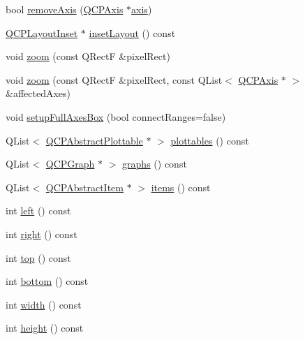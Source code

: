\begin{DoxyCompactItemize}
\item 
bool \mbox{\hyperlink{class_q_c_p_axis_rect_a03c39cd9704f0d36fb6cf980cdddcbaa}{remove\+Axis}} (\mbox{\hyperlink{class_q_c_p_axis}{Q\+C\+P\+Axis}} $\ast$\mbox{\hyperlink{class_q_c_p_axis_rect_a583ae4f6d78b601b732183f6cabecbe1}{axis}})
\item 
\mbox{\hyperlink{class_q_c_p_layout_inset}{Q\+C\+P\+Layout\+Inset}} $\ast$ \mbox{\hyperlink{class_q_c_p_axis_rect_a949f803466619924c7018df4b511ae10}{inset\+Layout}} () const
\item 
void \mbox{\hyperlink{class_q_c_p_axis_rect_a5fc8460564e81dcc2a9343dc8bc1fe67}{zoom}} (const Q\+RectF \&pixel\+Rect)
\item 
void \mbox{\hyperlink{class_q_c_p_axis_rect_ae481c28b50e10cfbbec59fde45e77367}{zoom}} (const Q\+RectF \&pixel\+Rect, const Q\+List$<$ \mbox{\hyperlink{class_q_c_p_axis}{Q\+C\+P\+Axis}} $\ast$ $>$ \&affected\+Axes)
\item 
void \mbox{\hyperlink{class_q_c_p_axis_rect_a5fa906175447b14206954f77fc7f1ef4}{setup\+Full\+Axes\+Box}} (bool connect\+Ranges=false)
\item 
Q\+List$<$ \mbox{\hyperlink{class_q_c_p_abstract_plottable}{Q\+C\+P\+Abstract\+Plottable}} $\ast$ $>$ \mbox{\hyperlink{class_q_c_p_axis_rect_a587d073a97b27bc7293fab4b2774ad59}{plottables}} () const
\item 
Q\+List$<$ \mbox{\hyperlink{class_q_c_p_graph}{Q\+C\+P\+Graph}} $\ast$ $>$ \mbox{\hyperlink{class_q_c_p_axis_rect_a2d9ded3eca97be1fcb5867949391bb88}{graphs}} () const
\item 
Q\+List$<$ \mbox{\hyperlink{class_q_c_p_abstract_item}{Q\+C\+P\+Abstract\+Item}} $\ast$ $>$ \mbox{\hyperlink{class_q_c_p_axis_rect_a03c113a2175448300ee8f944e24776ba}{items}} () const
\item 
int \mbox{\hyperlink{class_q_c_p_axis_rect_afb4a3de02046b20b9310bdb8fca781c3}{left}} () const
\item 
int \mbox{\hyperlink{class_q_c_p_axis_rect_a3f819d4a1b2193723d1fdafc573eea10}{right}} () const
\item 
int \mbox{\hyperlink{class_q_c_p_axis_rect_a45dbad181cbb9f09d068dbb76c817c95}{top}} () const
\item 
int \mbox{\hyperlink{class_q_c_p_axis_rect_acefdf1abaa8a8ab681e906cc2be9581e}{bottom}} () const
\item 
int \mbox{\hyperlink{class_q_c_p_axis_rect_a204645398a4f9d0b0189385c7c2cfb91}{width}} () const
\item 
int \mbox{\hyperlink{class_q_c_p_axis_rect_acc4377809e79d9a089ab790f39429b0d}{height}} () const

\end{DoxyCompactItemize}
